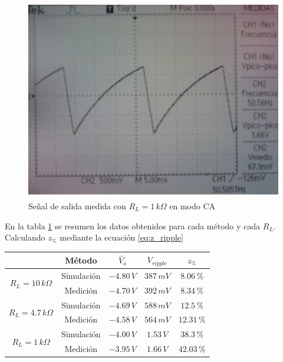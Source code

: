 \documentclass[10pt,spanish,a4paper,openany,notitlepage]{article}
\begin{document}
\begin{enumerate}
    \begin{figure}[H]
    \centering
    \includegraphics[width=350pt, height=250pt]{mediciones/F4-1K-CA.jpg}
    \caption{Señal de salida medida con $R_L = 1\,\unit{k\Omega}$ en modo CA}
    \label{fig:F4_1k_ca_med}
    \end{figure}
    
\end{enumerate}


En la tabla \ref{table:F4_z_ripple} se resumen los datos obtenidos para cada método y cada $R_L$. Calculando $z_{\%}$ mediante la ecuación \ref{eq:z_ripple}

\begin{table}[H]
\centering
\begin{tabular}{c|c|c|c|c|}
\cline{2-5}
& Método     &  $\overset{-}{V}_{o}$  & ${V}_{ripple}$ & $z_{\%}$ \\ \hline

\multicolumn{1}{|c|}{\multirow{2}{*}{$R_L = 10\,\unit{k\Omega}$}} & 
Simulación & $-4.80\,\unit{V}$ & $387\,\unit{mV}$ & $8.06\,\unit{\%}$ \\ \cline{2-5}
\multicolumn{1}{|c|}{} & 
Medición & $-4.70\,\unit{V}$ & $392\,\unit{mV}$ & $8.34\,\unit{\%}$     \\ \hline

\multicolumn{1}{|c|}{\multirow{2}{*}{$R_L = 4.7\,\unit{k\Omega}$}} & 
Simulación & $-4.69\,\unit{V}$ & $588\,\unit{mV}$ & $12.5\,\unit{\%}$ \\ \cline{2-5}
\multicolumn{1}{|c|}{} & 
Medición & $-4.58\,\unit{V}$ & $564\,\unit{mV}$ & $12.31\,\unit{\%}$   \\ \hline

\multicolumn{1}{|c|}{\multirow{2}{*}{$R_L = 1\,\unit{k\Omega}$}} & 
Simulación & $-4.00\,\unit{V}$ & $1.53\,\unit{V}$ & $38.3\,\unit{\%}$ \\ \cline{2-5}
\multicolumn{1}{|c|}{} & 
Medición & $-3.95\,\unit{V}$ & $1.66\,\unit{V}$ & $42.03\,\unit{\%}$     \\ \hline
\end{tabular}
\label{table:F4_z_ripple}
\end{table}
\end{document}
